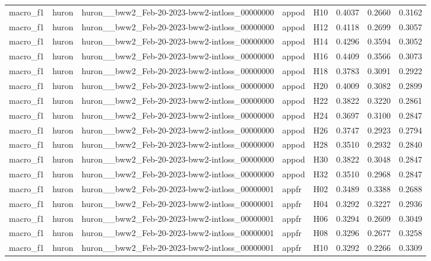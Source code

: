 \begin{table}[tbp]
\begin{tabular}{lllllrrr}
macro\_f1 & huron & huron\_\_bww2\_Feb-20-2023-bww2-intloss\_00000000 & appod & H10 & 0.4037 & 0.2660 & 0.3162 \\
macro\_f1 & huron & huron\_\_bww2\_Feb-20-2023-bww2-intloss\_00000000 & appod & H12 & 0.4118 & 0.2699 & 0.3057 \\
macro\_f1 & huron & huron\_\_bww2\_Feb-20-2023-bww2-intloss\_00000000 & appod & H14 & 0.4296 & 0.3594 & 0.3052 \\
macro\_f1 & huron & huron\_\_bww2\_Feb-20-2023-bww2-intloss\_00000000 & appod & H16 & 0.4409 & 0.3566 & 0.3073 \\
macro\_f1 & huron & huron\_\_bww2\_Feb-20-2023-bww2-intloss\_00000000 & appod & H18 & 0.3783 & 0.3091 & 0.2922 \\
macro\_f1 & huron & huron\_\_bww2\_Feb-20-2023-bww2-intloss\_00000000 & appod & H20 & 0.4009 & 0.3082 & 0.2899 \\
macro\_f1 & huron & huron\_\_bww2\_Feb-20-2023-bww2-intloss\_00000000 & appod & H22 & 0.3822 & 0.3220 & 0.2861 \\
macro\_f1 & huron & huron\_\_bww2\_Feb-20-2023-bww2-intloss\_00000000 & appod & H24 & 0.3697 & 0.3100 & 0.2847 \\
macro\_f1 & huron & huron\_\_bww2\_Feb-20-2023-bww2-intloss\_00000000 & appod & H26 & 0.3747 & 0.2923 & 0.2794 \\
macro\_f1 & huron & huron\_\_bww2\_Feb-20-2023-bww2-intloss\_00000000 & appod & H28 & 0.3510 & 0.2932 & 0.2840 \\
macro\_f1 & huron & huron\_\_bww2\_Feb-20-2023-bww2-intloss\_00000000 & appod & H30 & 0.3822 & 0.3048 & 0.2847 \\
macro\_f1 & huron & huron\_\_bww2\_Feb-20-2023-bww2-intloss\_00000000 & appod & H32 & 0.3510 & 0.2968 & 0.2847 \\
macro\_f1 & huron & huron\_\_bww2\_Feb-20-2023-bww2-intloss\_00000001 & appfr & H02 & 0.3489 & 0.3388 & 0.2688 \\
macro\_f1 & huron & huron\_\_bww2\_Feb-20-2023-bww2-intloss\_00000001 & appfr & H04 & 0.3292 & 0.3227 & 0.2936 \\
macro\_f1 & huron & huron\_\_bww2\_Feb-20-2023-bww2-intloss\_00000001 & appfr & H06 & 0.3294 & 0.2609 & 0.3049 \\
macro\_f1 & huron & huron\_\_bww2\_Feb-20-2023-bww2-intloss\_00000001 & appfr & H08 & 0.3296 & 0.2677 & 0.3258 \\
macro\_f1 & huron & huron\_\_bww2\_Feb-20-2023-bww2-intloss\_00000001 & appfr & H10 & 0.3292 & 0.2266 & 0.3309 \\

\end{tabular}
\end{table}
